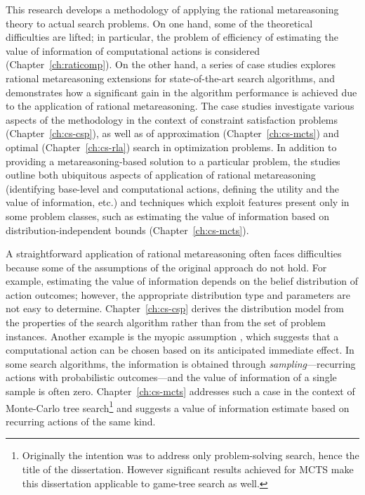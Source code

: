 This research develops a methodology of applying the rational
metareasoning theory to actual search problems.  On one hand, some
of the theoretical difficulties are lifted; in particular, the problem
of efficiency of estimating the value of information of computational
actions is considered (Chapter~\ref{ch:raticomp}). On the other hand,
a series of case studies explores rational metareasoning extensions
for state-of-the-art search algorithms, and demonstrates how a
significant gain in the algorithm performance is achieved due to the
application of rational metareasoning. The case studies investigate
various aspects of the methodology in the context of constraint satisfaction
problems (Chapter~\ref{ch:cs-csp}), as well as of approximation
(Chapter~\ref{ch:cs-mcts}) and optimal (Chapter~\ref{ch:cs-rla})
search in optimization problems. In addition to providing a
metareasoning-based solution to a particular problem, the studies
outline both ubiquitous aspects of application of rational metareasoning
(identifying base-level and computational actions, defining the
utility and the value of information, etc.)  and techniques which
exploit features present only in some problem classes, such as
estimating the value of information based on distribution-independent
bounds (Chapter~\ref{ch:cs-mcts}).

A straightforward application of rational metareasoning often faces
difficulties because some of the assumptions of the original approach do not
hold. For example, estimating the value of information depends on
the belief distribution of action outcomes; however, the appropriate
distribution type and parameters are not easy to determine. Chapter~\ref{ch:cs-csp}
derives the distribution model from the properties of the search
algorithm rather than from the set of problem instances. Another
example is the myopic assumption \cite{Russell.right}, which suggests
that a computational action can be chosen based on its anticipated immediate
effect. In some search algorithms, the information is obtained through
\emph{sampling}---recurring actions with probabilistic outcomes---and
the value of information of a single sample is often
zero. Chapter~\ref{ch:cs-mcts} addresses such a case in the context
of Monte-Carlo tree search\footnote{Originally the intention was to address only problem-solving search,
hence the title of the dissertation. However significant results
achieved for MCTS make this dissertation applicable to game-tree search as well.} and suggests a value of information
estimate based on recurring actions of the same kind.

